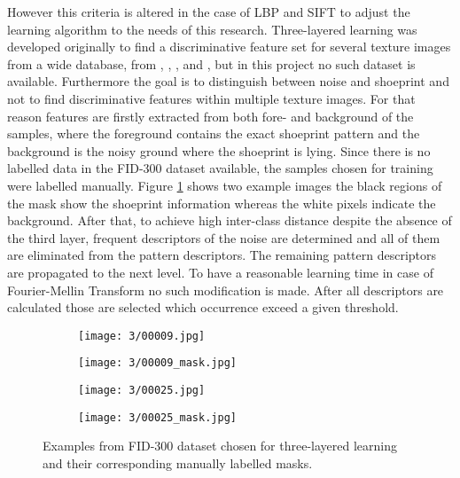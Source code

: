 \documentclass[draft,final]{vutinfth} %
\begin{document}
However this criteria is altered in the case of LBP and SIFT to adjust the learning algorithm to the needs of this research.
Three-layered learning was developed originally to find a discriminative feature set for several texture images from a wide database, from \cite{ojala2002outex}, \cite{dana1999reflectance}, \cite{boland2001neural}, \cite{jantzen2005pap} and \cite{brahnam2007introduction}, but in this project no such dataset is available.
Furthermore the goal is to distinguish between noise and shoeprint and not to find discriminative features within multiple texture images.
For that reason features are firstly extracted from both fore- and background of the samples, where the foreground contains the exact shoeprint pattern and the background is the noisy ground where the shoeprint is lying.
Since there is no labelled data in the FID-300 \cite{kortylewski2014unsupervised} dataset available, the samples chosen for training were labelled manually.
Figure \ref{fig:pe:mask} shows two example images the black regions of the mask show the shoeprint information whereas the white pixels indicate the background.
After that, to achieve high inter-class distance despite the absence of the third layer, frequent descriptors of the noise are determined and all of them are eliminated from the pattern descriptors.
The remaining pattern descriptors are propagated to the next level. 
To have a reasonable learning time in case of Fourier-Mellin Transform no such modification is made.
After all descriptors are calculated those are selected which occurrence exceed a given threshold.

\begin{figure}[h]
  \centering
  \begin{subfigure}[b]{0.24\columnwidth}
    \centering
    \texttt{[image: 3/00009.jpg]}
  \end{subfigure}
  \begin{subfigure}[b]{0.24\columnwidth}
    \centering
    \texttt{[image: 3/00009\_mask.jpg]}
  \end{subfigure}
  \begin{subfigure}[b]{0.24\columnwidth}
    \centering
    \texttt{[image: 3/00025.jpg]}
  \end{subfigure}
  \begin{subfigure}[b]{0.24\columnwidth}
    \centering
    \texttt{[image: 3/00025\_mask.jpg]}
  \end{subfigure}
  \caption{Examples from FID-300 \cite{kortylewski2014unsupervised} dataset chosen for three-layered learning and their corresponding manually labelled masks.}
  \label{fig:pe:mask}
\end{figure}
\end{document}

